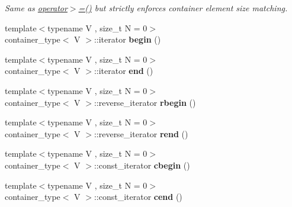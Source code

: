 \begin{DoxyCompactItemize}
\begin{DoxyCompactList}\small\item\em Same as \hyperlink{classheterogeneous_1_1heterovector_3_01_t_01_4_abda9244ae3f7598d912dd2b81e0f369a}{operator$>$=()} but strictly enforces container element size matching. \end{DoxyCompactList}\item 
\hypertarget{classheterogeneous_1_1heterovector_3_01_t_01_4_a6378a08eae5f676f6ff98ce2511521ea}{}{\footnotesize template$<$typename V , size\+\_\+t N = 0$>$ }\\container\+\_\+type$<$ V $>$\+::iterator {\bfseries begin} ()\label{classheterogeneous_1_1heterovector_3_01_t_01_4_a6378a08eae5f676f6ff98ce2511521ea}

\item 
\hypertarget{classheterogeneous_1_1heterovector_3_01_t_01_4_a6b4d3213ba4845e6b1a0e36176c4784e}{}{\footnotesize template$<$typename V , size\+\_\+t N = 0$>$ }\\container\+\_\+type$<$ V $>$\+::iterator {\bfseries end} ()\label{classheterogeneous_1_1heterovector_3_01_t_01_4_a6b4d3213ba4845e6b1a0e36176c4784e}

\item 
\hypertarget{classheterogeneous_1_1heterovector_3_01_t_01_4_a0edceffae98c7c92c07f9b9d1e463350}{}{\footnotesize template$<$typename V , size\+\_\+t N = 0$>$ }\\container\+\_\+type$<$ V $>$\+::reverse\+\_\+iterator {\bfseries rbegin} ()\label{classheterogeneous_1_1heterovector_3_01_t_01_4_a0edceffae98c7c92c07f9b9d1e463350}

\item 
\hypertarget{classheterogeneous_1_1heterovector_3_01_t_01_4_a0b1bfd70cf228b2a1a2d28c87d8d8f65}{}{\footnotesize template$<$typename V , size\+\_\+t N = 0$>$ }\\container\+\_\+type$<$ V $>$\+::reverse\+\_\+iterator {\bfseries rend} ()\label{classheterogeneous_1_1heterovector_3_01_t_01_4_a0b1bfd70cf228b2a1a2d28c87d8d8f65}

\item 
\hypertarget{classheterogeneous_1_1heterovector_3_01_t_01_4_a46c27f23b66e0fee6515c038dcd9c0a1}{}{\footnotesize template$<$typename V , size\+\_\+t N = 0$>$ }\\container\+\_\+type$<$ V $>$\+::const\+\_\+iterator {\bfseries cbegin} ()\label{classheterogeneous_1_1heterovector_3_01_t_01_4_a46c27f23b66e0fee6515c038dcd9c0a1}

\item 
\hypertarget{classheterogeneous_1_1heterovector_3_01_t_01_4_a62c545d71a1918d21688d7e66e6ace0b}{}{\footnotesize template$<$typename V , size\+\_\+t N = 0$>$ }\\container\+\_\+type$<$ V $>$\+::const\+\_\+iterator {\bfseries cend} ()\label{classheterogeneous_1_1heterovector_3_01_t_01_4_a62c545d71a1918d21688d7e66e6ace0b}


\end{DoxyCompactItemize}
